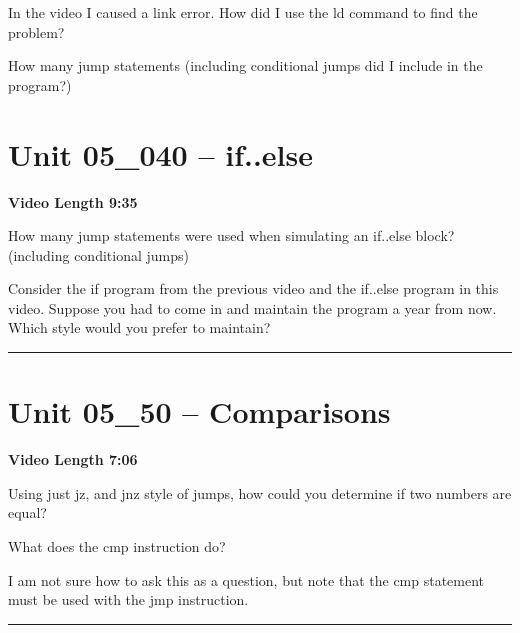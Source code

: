 \documentclass[letterpaper,12pt]{exam}
\newcommand{\unit}{Unit 05}
\begin{document}
\begin{questions}
\begin{samepage}
    \question In the video I caused a link error.  How did I use the ld command to find the problem?
    \vspace{5mm}
\end{samepage}
\par
 \begin{samepage}
    \question How many jump statements (including conditional jumps did I include in the program?)
    \vspace{5mm}
\end{samepage}
\par
\section*{\unit\_040 -- if..else}
\par{\selectfont\textbf{Video Length 9:35}}
\begin{samepage}
    \question How many jump statements were used when simulating an if..else block? (including conditional jumps)
    \vspace{5mm}
\end{samepage}
\par

\begin{samepage}
    \question Consider the if program from the previous video and the if..else program in this video.  Suppose you had to come in and maintain the program a year from now.  Which style would you prefer to maintain?
    \vspace{5mm}
\end{samepage}
\par
 
\rule{0.5\textwidth}{.4pt} %
 \section*{\unit\_50 -- Comparisons }
 \par{\selectfont\textbf{Video Length 7:06}}
 \begin{samepage}
     \question Using just jz, and jnz style of jumps, how could you determine if two numbers are equal?
     \vspace{5mm}
 \end{samepage}
 \par
 \begin{samepage}
     \question What does the cmp instruction do?
     \vspace{5mm}
 \end{samepage}
 \par
  \begin{samepage}
      \question I am not sure how to ask this as a question, but note that the cmp statement must be used with the jmp instruction.
      \vspace{5mm}
  \end{samepage}
  \par
 \rule{0.5\textwidth}{.4pt} %

\end{questions}
\end{document}
